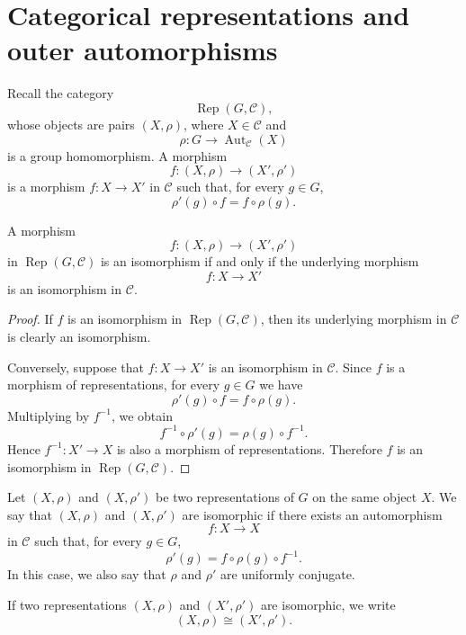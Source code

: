 \section{Categorical representations and outer automorphisms}

Recall the category
\[
    \operatorname{Rep}(G,\mathcal{C}),
\]
whose objects are pairs \((X,\rho)\), where \(X\in \mathcal{C}\) and
\[
    \rho:G\longrightarrow \operatorname{Aut}_{\mathcal{C}}(X)
\]
is a group homomorphism. A morphism
\[
    f:(X,\rho)\longrightarrow (X',\rho')
\]
is a morphism \(f:X\to X'\) in \(\mathcal{C}\) such that, for every \(g\in G\),
\[
    \rho'(g)\circ f=f\circ \rho(g).
\]

\begin{lemma}
    A morphism
    \[
        f:(X,\rho)\longrightarrow (X',\rho')
    \]
    in \(\operatorname{Rep}(G,\mathcal{C})\) is an isomorphism if and only if the
    underlying morphism
    \[
        f:X\longrightarrow X'
    \]
    is an isomorphism in \(\mathcal{C}\).
\end{lemma}

\begin{proof}
    If \(f\) is an isomorphism in \(\operatorname{Rep}(G,\mathcal{C})\), then its
    underlying morphism in \(\mathcal{C}\) is clearly an isomorphism.

    Conversely, suppose that \(f:X\to X'\) is an isomorphism in \(\mathcal{C}\).
    Since \(f\) is a morphism of representations, for every \(g\in G\) we have
    \[
        \rho'(g)\circ f=f\circ \rho(g).
    \]
    Multiplying by \(f^{-1}\), we obtain
    \[
        f^{-1}\circ \rho'(g)=\rho(g)\circ f^{-1}.
    \]
    Hence \(f^{-1}:X'\to X\) is also a morphism of representations. Therefore
    \(f\) is an isomorphism in \(\operatorname{Rep}(G,\mathcal{C})\).
\end{proof}

\begin{definition}
    Let \((X,\rho)\) and \((X,\rho')\) be two representations of \(G\) on the same
    object \(X\). We say that \((X,\rho)\) and \((X,\rho')\) are isomorphic if there
    exists an automorphism
    \[
        f:X\longrightarrow X
    \]
    in \(\mathcal{C}\) such that, for every \(g\in G\),
    \[
        \rho'(g)=f\circ \rho(g)\circ f^{-1}.
    \]
    In this case, we also say that \(\rho\) and \(\rho'\) are uniformly conjugate.
\end{definition}

If two representations \((X,\rho)\) and \((X',\rho')\) are isomorphic, we write
    \[
        (X,\rho)\cong (X',\rho').
    \]

